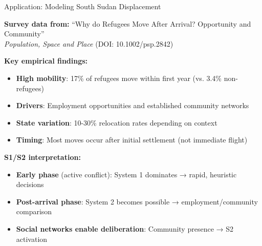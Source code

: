 \documentclass[aspectratio=169]{beamer}
\begin{document}
\begin{frame}{Application: Modeling South Sudan Displacement}

\textbf{Survey data from:} ``Why do Refugees Move After Arrival? Opportunity and Community''\\
\textit{Population, Space and Place} (DOI: 10.1002/psp.2842)

\vspace{0.5em}

\textbf{Key empirical findings:}
\begin{itemize}
    \item \textbf{High mobility}: 17\% of refugees move within first year (vs. 3.4\% non-refugees)
    \item \textbf{Drivers}: Employment opportunities and established community networks
    \item \textbf{State variation}: 10-30\% relocation rates depending on context
    \item \textbf{Timing}: Most moves occur after initial settlement (not immediate flight)
\end{itemize}

\vspace{0.5em}

\textbf{S1/S2 interpretation:}
\begin{itemize}
    \item \textbf{Early phase} (active conflict): System 1 dominates → rapid, heuristic decisions
    \item \textbf{Post-arrival phase}: System 2 becomes possible → employment/community comparison
    \item \textbf{Social networks enable deliberation}: Community presence → S2 activation
\end{itemize}

\end{frame}
\end{document}
